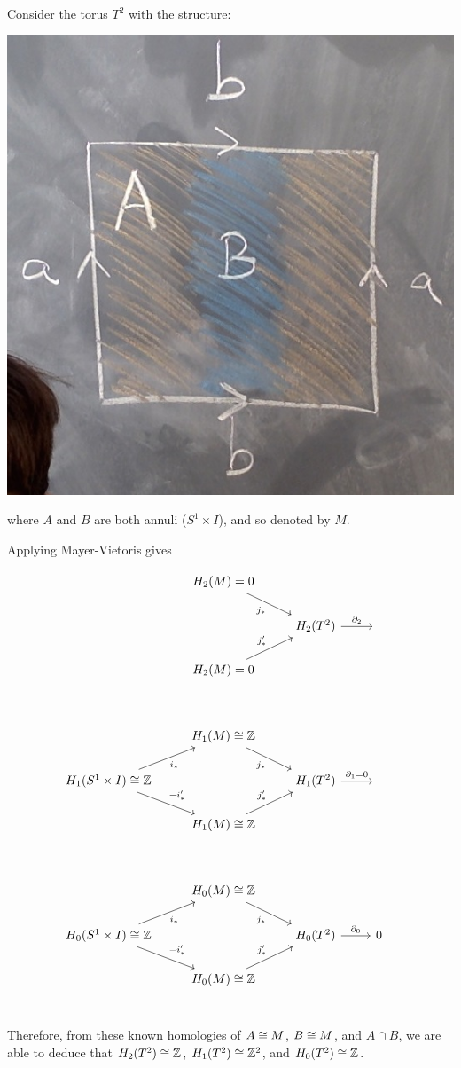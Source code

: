 \documentclass[11pt,leqno,oneside]{amsart}
\numberwithin{thm}{section}
\renewcommand{\d}{\partial}
\newcommand{\homl}[1][n]{H_{#1}}
\newcommand{\x}{\times}
\begin{document}
\begin{example}
  Consider the torus $T^2$ with the structure:

  \includegraphics[scale=0.15]{images/torus-cw-mayer-vietoris}

  where $A$ and $B$ are both annuli ($S^1 \x I$), and so denoted by $M$.

  Applying Mayer-Vietoris gives

  $$\begin{tikzcd}
    & & \homl[2](M) = 0 \arrow[rd, "j_*"'] \\
    & & &\homl[2](T^2) \arrow[r, "\d_2"] &\,\\
    & &\homl[2](M) = 0 \arrow[ru, "j'_*"] \\
    \\
    & & \homl[1](M) \isom \Z \arrow[rd, "j_*"'] \\
    &\homl[1](S^1 \x I) \isom \Z \arrow[ru, "i_*"'] \arrow[rd, "-i'_*"] & &\homl[1](T^2) \arrow[r, "\d_1 = 0"] &\,\\
    & &\homl[1](M) \isom \Z \arrow[ru, "j'_*"] \\
    \\
    & & \homl[0](M) \isom \Z \arrow[rd, "j_*"'] \\
    &\homl[0](S^1 \x I) \isom \Z \arrow[ru, "i_*"'] \arrow[rd, "-i'_*"] & &\homl[0](T^2) \arrow[r, "\d_0"] &0 &\,\\
    & &\homl[0](M) \isom \Z \arrow[ru, "j'_*"] \\
  \end{tikzcd}$$

  Therefore, from these known homologies of $A \mathrel{\cong} M$, $B \mathrel{\cong} M$, and $A \cap B$, we are able to deduce that $H_2(T^2) \mathrel{\cong} {\mathbb Z}$, $H_1(T^2) \mathrel{\cong} {\mathbb Z}^2$, and $H_0(T^2) \mathrel{\cong} {\mathbb Z}$.
\end{example}
\end{document}
